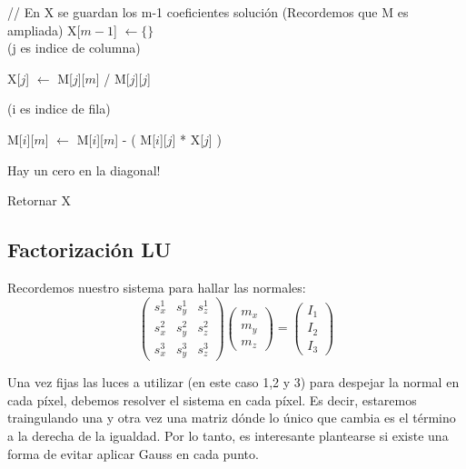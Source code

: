 \begin{algorithm}[H]
\begin{algorithmic}

    // En X se guardan los m-1 coeficientes solución (Recordemos que M es ampliada)
    \State X[$m-1$] $\gets \{\}$ \\

      (j es indice de columna)


            \State X[$j$] $\gets$ M[$j$][$m$] / M[$j$][$j$]

              (i es indice de fila)

                \State M[$i$][$m$] $\gets$ M[$i$][$m$] - ( M[$i$][$j$] * X[$j$] )

            \EndFor

        \Else
            \State Hay un cero en la diagonal!
        \EndIf
    \EndFor

    \State Retornar X

\EndFunction
\end{algorithmic}
\end{algorithm}


\subsection{Factorización LU}

Recordemos nuestro sistema para hallar las normales:
\[
\begin{pmatrix}
    s_{x}^{1} & s_{y}^{1} & s_{z}^{1} \\
    s_{x}^{2} & s_{y}^{2} & s_{z}^{2} \\
    s_{x}^{3} & s_{y}^{3} & s_{z}^{3}
\end{pmatrix}
\begin{pmatrix}
    m_{x} \\
    m_{y} \\
    m_{z}
\end{pmatrix}
=
\begin{pmatrix}
    I_{1} \\
    I_{2} \\
    I_{3}
\end{pmatrix}
\]

Una vez fijas las luces a utilizar (en este caso 1,2 y 3) para despejar la normal en cada píxel, debemos resolver el sistema en cada píxel. Es decir, estaremos traingulando una y otra vez una matriz dónde lo único que cambia es el término a la derecha de la igualdad. Por lo tanto, es interesante plantearse si existe una forma de evitar aplicar Gauss en cada punto. \\

